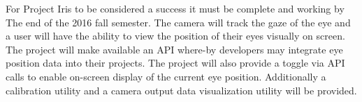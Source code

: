 
For Project Iris to be considered a success it must be complete and working by The end of the 2016 fall semester.  The camera will track the gaze of the eye and a user will have the ability to view the position of their eyes visually on screen.  The project will make available an API where-by developers may integrate eye position data into their projects. The project will also provide a toggle via API calls to enable on-screen display of the current eye position. Additionally a calibration utility and a camera output data visualization utility will be provided.